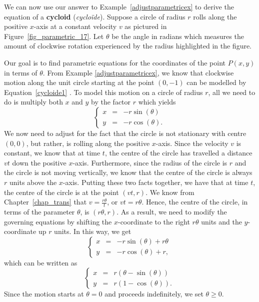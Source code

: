 \ifanalysis

We can now use our answer to Example~\ref{adjustparametricex} to derive the equation of a \textbf{cycloid} (\textit{cyclo\"ide}).  Suppose a circle of radius $r$ rolls along the positive $x$-axis at a constant velocity $v$ as pictured in Figure~\ref{fig_parametric_17}.  Let $\theta$ be the angle in radians which measures the amount of clockwise rotation experienced by the radius highlighted in the figure.  

Our goal is to find parametric equations for the coordinates of the point $P(x,y)$ in terms of $\theta$.  From  Example \ref{adjustparametricex}, we know that clockwise motion along the unit circle starting at the point $(0,-1)$ can be modelled by Equation~\eqref{cycloide1} . To model this motion on a circle of radius $r$, all we need to do is multiply both $x$ and $y$ by the factor $r$ which yields 
$$
\left\{\begin{array}{rcl} x & = & -r\sin(\theta)\\[0.2cm] y & = & -r\cos(\theta). \end{array}\right.\,
$$  
We now need to adjust for the fact that the circle is not stationary with centre $(0,0)$, but rather, is rolling along the positive $x$-axis.  Since the velocity $v$ is constant, we know that at time $t$, the centre of the circle has travelled a distance $vt$ down the positive $x$-axis.  Furthermore, since the radius of the circle is $r$ and the circle is not  moving vertically, we know that the centre of the circle is always $r$ units above the $x$-axis.  Putting these two facts together, we have that at time $t$, the centre of the circle is at the point $(vt,r)$. We know from Chapter~\ref{chap_trans} that $v = \frac{r \theta}{t}$, or $vt = r\theta$.  Hence, the centre of the circle, in terms of the parameter $\theta$, is $(r\theta,r)$. As a result, we need to modify the governing equations by shifting the $x$-coordinate to the right $r\theta$ units and the $y$-coordinate up $r$ units.  In this way, we get 
$$
\left\{\begin{array}{rcl} x & = &  -r\sin(\theta)+ r\theta\\[0.2cm] y & = & -r\cos(\theta) + r, \end{array}\right.\,
$$
which can be written as 
$$
\left\{\begin{array}{rcl} x & = &  r(\theta -\sin(\theta))\\[0.2cm] y & = & r(1-\cos(\theta)). \end{array}\right.\,
$$
 Since the motion starts at $\theta = 0$ and proceeds indefinitely, we set  $\theta \geq 0$.  


